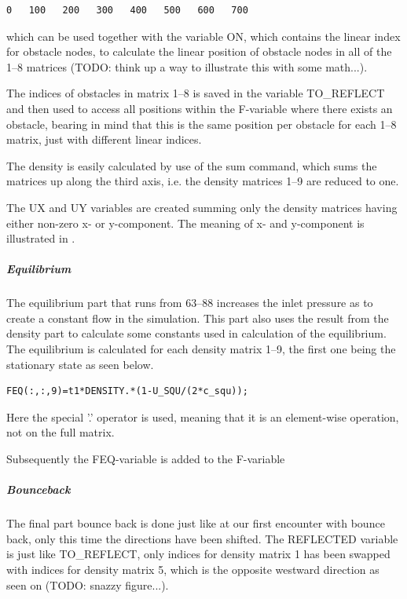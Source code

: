 \begin{verbatim}
0   100   200   300   400   500   600   700
\end{verbatim}

which can be used together with the variable ON, which contains the linear index for obstacle nodes, to calculate the linear position of obstacle nodes in all of the 1--8 matrices (TODO: think up a way to illustrate this with some math...).

The indices of obstacles in matrix 1--8 is saved in the variable TO\_REFLECT and then used to access all positions within the F-variable where there exists an obstacle, bearing in mind that this is the same position per obstacle for each 1--8 matrix, just with different linear indices.

The density is easily calculated by use of the sum command, which sums the matrices up along the third axis, i.e. the density matrices 1--9 are reduced to one.

The UX and UY variables are created summing only the density matrices having either non-zero x- or y-component. The meaning of x- and y-component is illustrated in .


\subparagraph*{Equilibrium}
The equilibrium part that runs from 63--88 increases the inlet pressure as to create a constant flow in the simulation. This part also uses the result from the density part to calculate some constants used in calculation of the equilibrium. The equilibrium is calculated for each density matrix 1--9, the first one being the stationary state as seen below.

\begin{verbatim}
FEQ(:,:,9)=t1*DENSITY.*(1-U_SQU/(2*c_squ));
\end{verbatim}

Here the special '.' operator is used, meaning that it is an element-wise operation, not on the full matrix.

Subsequently the FEQ-variable is added to the F-variable

\subparagraph*{Bounceback}
The final part bounce back is done just like at our first encounter with bounce back, only this time the directions have been shifted. The REFLECTED variable is just like TO\_REFLECT, only indices for density matrix 1 has been swapped with indices for density matrix 5, which is the opposite westward direction as seen on (TODO: snazzy figure...).



